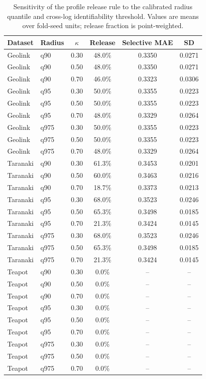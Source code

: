 \begin{table}
\caption{Sensitivity of the profile release rule to the calibrated radius quantile and cross-log identifiability threshold. Values are means over fold-seed units; release fraction is point-weighted.}
\label{tab:sensitivity}
\centering
\scriptsize
\begin{tabular*}{\textwidth}{@{\extracolsep{\fill}}llcccc@{}}
\toprule
Dataset & Radius & $\kappa$ & Release & Selective MAE & SD \\
\midrule
Geolink & q90 & 0.30 & 48.0\% & 0.3350 & 0.0271 \\
Geolink & q90 & 0.50 & 48.0\% & 0.3350 & 0.0271 \\
Geolink & q90 & 0.70 & 46.0\% & 0.3323 & 0.0306 \\
Geolink & q95 & 0.30 & 50.0\% & 0.3355 & 0.0223 \\
Geolink & q95 & 0.50 & 50.0\% & 0.3355 & 0.0223 \\
Geolink & q95 & 0.70 & 48.0\% & 0.3329 & 0.0264 \\
Geolink & q975 & 0.30 & 50.0\% & 0.3355 & 0.0223 \\
Geolink & q975 & 0.50 & 50.0\% & 0.3355 & 0.0223 \\
Geolink & q975 & 0.70 & 48.0\% & 0.3329 & 0.0264 \\
Taranaki & q90 & 0.30 & 61.3\% & 0.3453 & 0.0201 \\
Taranaki & q90 & 0.50 & 60.0\% & 0.3463 & 0.0216 \\
Taranaki & q90 & 0.70 & 18.7\% & 0.3373 & 0.0213 \\
Taranaki & q95 & 0.30 & 68.0\% & 0.3523 & 0.0246 \\
Taranaki & q95 & 0.50 & 65.3\% & 0.3498 & 0.0185 \\
Taranaki & q95 & 0.70 & 21.3\% & 0.3424 & 0.0145 \\
Taranaki & q975 & 0.30 & 68.0\% & 0.3523 & 0.0246 \\
Taranaki & q975 & 0.50 & 65.3\% & 0.3498 & 0.0185 \\
Taranaki & q975 & 0.70 & 21.3\% & 0.3424 & 0.0145 \\
Teapot & q90 & 0.30 & 0.0\% & -- & -- \\
Teapot & q90 & 0.50 & 0.0\% & -- & -- \\
Teapot & q90 & 0.70 & 0.0\% & -- & -- \\
Teapot & q95 & 0.30 & 0.0\% & -- & -- \\
Teapot & q95 & 0.50 & 0.0\% & -- & -- \\
Teapot & q95 & 0.70 & 0.0\% & -- & -- \\
Teapot & q975 & 0.30 & 0.0\% & -- & -- \\
Teapot & q975 & 0.50 & 0.0\% & -- & -- \\
Teapot & q975 & 0.70 & 0.0\% & -- & -- \\
\bottomrule
\end{tabular*}
\end{table}